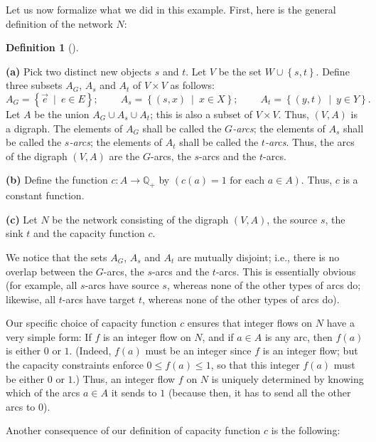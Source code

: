 \documentclass[numbers=enddot,12pt,final,onecolumn,notitlepage]{scrartcl}%
\theoremstyle{definition}
\newtheorem{defi}[theo]{Definition}
\newenvironment{definition}[1][]
{\begin{defi}[#1]\begin{leftbar}}
{\end{leftbar}\end{defi}}
\begin{document}
Let us now formalize what we did in this example. First, here is the general
definition of the network $N$:

\begin{definition}
\textbf{(a)} Pick two distinct new objects $s$ and $t$. Let $V$ be the set
$W\cup\left\{  s,t\right\}  $. Define three subsets $A_{G}$, $A_{s}$ and
$A_{t}$ of $V\times V$ as follows:%
\[
A_{G}=\left\{  \overrightarrow{e}\ \mid\ e\in E\right\}
;\ \ \ \ \ \ \ \ \ \ A_{s}=\left\{  \left(  s,x\right)  \ \mid\ x\in
X\right\}  ;\ \ \ \ \ \ \ \ \ \ A_{t}=\left\{  \left(  y,t\right)
\ \mid\ y\in Y\right\}  .
\]
Let $A$ be the union $A_{G}\cup A_{s}\cup A_{t}$; this is also a subset of
$V\times V$. Thus, $\left(  V,A\right)  $ is a digraph. The elements of
$A_{G}$ shall be called the $G$\textit{-arcs}; the elements of $A_{s}$ shall
be called the $s$\textit{-arcs}; the elements of $A_{t}$ shall be called the
$t$\textit{-arcs}. Thus, the arcs of the digraph $\left(  V,A\right)  $ are
the $G$-arcs, the $s$-arcs and the $t$-arcs.

\textbf{(b)} Define the function $c:A\rightarrow\mathbb{Q}_{+}$ by $\left(
c\left(  a\right)  =1\text{ for each }a\in A\right)  $. Thus, $c$ is a
constant function.

\textbf{(c)} Let $N$ be the network consisting of the digraph $\left(
V,A\right)  $, the source $s$, the sink $t$ and the capacity function $c$.
\end{definition}

We notice that the sets $A_{G}$, $A_{s}$ and $A_{t}$ are mutually disjoint;
i.e., there is no overlap between the $G$-arcs, the $s$-arcs and the $t$-arcs.
This is essentially obvious (for example, all $s$-arcs have source $s$,
whereas none of the other types of arcs do; likewise, all $t$-arcs have target
$t$, whereas none of the other types of arcs do).

Our specific choice of capacity function $c$ ensures that integer flows on $N$
have a very simple form: If $f$ is an integer flow on $N$, and if $a\in A$ is
any arc, then $f\left(  a\right)  $ is either $0$ or $1$. (Indeed, $f\left(
a\right)  $ must be an integer since $f$ is an integer flow; but the capacity
constraints enforce $0\leq f\left(  a\right)  \leq1$, so that this integer
$f\left(  a\right)  $ must be either $0$ or $1$.) Thus, an integer flow $f$ on
$N$ is uniquely determined by knowing which of the arcs $a\in A$ it sends to
$1$ (because then, it has to send all the other arcs to $0$).

Another consequence of our definition of capacity function $c$ is the following:
\end{document}
